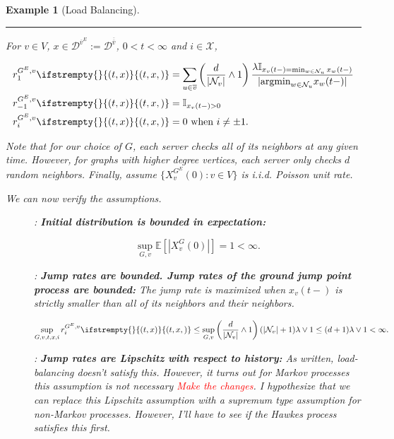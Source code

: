 \documentclass[12pt]{article}
\newcommand{\mb}{\mathbb}
\newcommand{\mc}{\mathcal}
\newcommand{\ov}{\overline}
\newcommand{\te}{\text}
\newcommand{\tr}{\textcolor{red}}
\newcommand{\lin}{\rule{\linewidth}{0.4 pt}}
\newcommand{\ex}[1]{\mb{E}\left[#1\right]}			%
\newcommand{\cad}{\mc{D}}							%
\newcommand{\sta}{\mc{X}}							%
\newcommand{\neigh}[1]{\mc{N}_{#1}}				%
\newcommand{\cl}[1]{\ov{#1}}						%
\newcommand{\Xf}{X}									%
\newcommand{\rate}{r}								%
\newcommand{\xf}{x}									%
\newcommand{\vind}[1]{_{#1}}						%
\newcommand{\tme}[1]{(#1)}							%
\newcommand{\gind}[1]{^{#1}}						%
\newcommand{\vpara}[1]{^{#1}}						%
\newcommand{\stpara}[1]{_{#1}}						%
\newcommand{\gvpara}[2]{^{#1,#2}}					%
\newcommand{\tmepro}[3]{
\ifstrempty{#3}{
	\left(#1,#2\right)}{
	\left(#1,#2,#3\right)}}							%
\renewcommand{\d}{d}								%
\newcommand{\ecl}[1]{\ov{#1}^E}						%
\newtheorem{example}[thms]{Example}
\begin{document}
\begin{example}[Load Balancing]
\lin

For \(v \in V\), \(\xf \in \cad\vpara{\ecl{v}}:=\cad\vpara{\cl{\cl{v}}}\), \(0 < t < \infty\) and \(i \in \sta\),

\begin{align*}
\rate\stpara{1}\gvpara{G^E}{v}\tmepro{t}{\xf}{} &= \sum_{u \in \cl{v}} \left(\frac{\d}{|\neigh{v}|}\wedge 1\right)\frac{\lambda\mb{I}_{\xf\vind{v}\tme{t-} = \min_{w\in\neigh{u}} \xf\vind{w}\tme{t-}}}{|\te{argmin}_{w\in\neigh{u}} \xf\vind{w}\tme{t-}|}\\
\rate\stpara{-1}\gvpara{G^E}{v}\tmepro{t}{\xf}{} &= \mb{I}_{\xf\vind{v}\tme{t-} > 0}\\
\rate\stpara{i}\gvpara{G^E}{v}\tmepro{t}{\xf}{} &= 0 \te{ when } i \neq \pm 1.
\end{align*}

Note that for our choice of \(G\), each server checks all of its neighbors at any given time. However, for graphs with higher degree vertices, each server only checks \(\d\) random neighbors. Finally, assume \(\{\Xf\vind{v}\gind{G^E}\tme{0}: v \in V\}\) is i.i.d. Poisson unit rate.

We can now verify the assumptions.

\begin{description}
\item[] \cite[Assumption \ref{F-a::bddinit}]{F}: \textbf{Initial distribution is bounded in expectation:}

\[\sup_{G,v} \ex{|\Xf\vind{v}\gind{G}\tme{0}|} = 1 < \infty.\]

\item[] \cite[Assumption \ref{F-a::bddr}]{F}: \textbf{Jump rates are bounded. Jump rates of the ground jump point process are bounded:} The jump rate is maximized when \(\xf\vind{v}\tme{t-}\) is strictly smaller than all of its neighbors and their neighbors.

\[\sup_{G,v,t,\xf,i} \rate\stpara{i}\gvpara{G^E}{v}\tmepro{t}{\xf}{} \leq \sup_{G,v}\left(\frac{d}{|\neigh{v}|}\wedge 1\right)(|\neigh{v}|+1)\lambda \vee 1\leq (d+1)\lambda\vee 1 < \infty.\]

\item[] \cite[Assumption \ref{F-a::liprx}]{F}: \textbf{Jump rates are Lipschitz with respect to history:} As written, load-balancing doesn't satisfy this. However, it turns out for Markov processes this assumption is not necessary \tr{Make the changes}. I hypothesize that we can replace this Lipschitz assumption with a supremum type assumption for non-Markov processes. However, I'll have to see if the Hawkes process satisfies this first.


\end{description}
\end{example}
\end{document}
